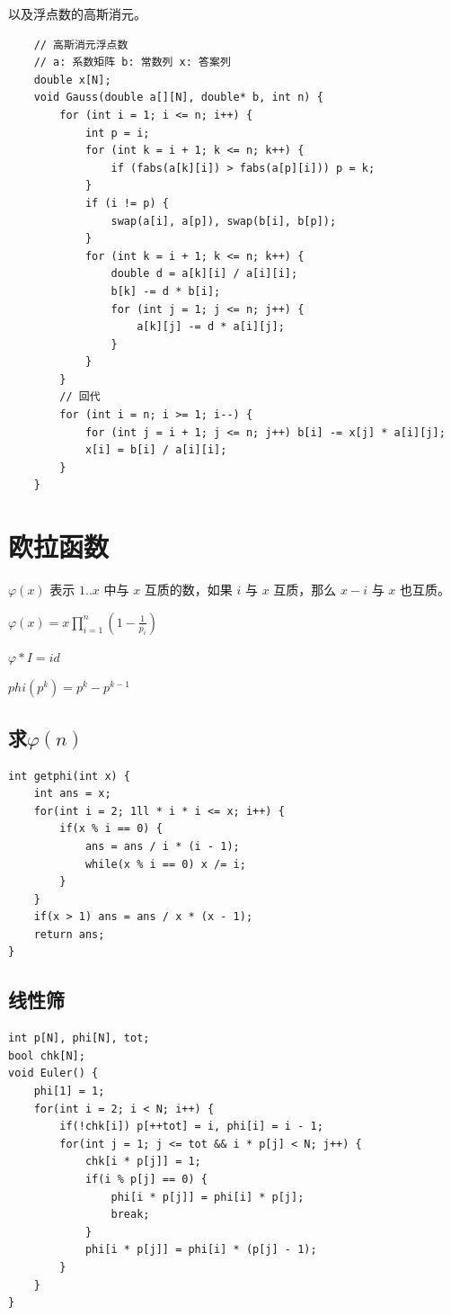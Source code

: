 \documentclass[a4paper,11pt,twoside,fontset = fandol,UTF8]{ctexbook} %
\begin{document}
	以及浮点数的高斯消元。
	
	\begin{lstlisting}
	// 高斯消元浮点数
	// a: 系数矩阵 b: 常数列 x: 答案列
	double x[N];
	void Gauss(double a[][N], double* b, int n) {
	    for (int i = 1; i <= n; i++) {
	        int p = i;
	        for (int k = i + 1; k <= n; k++) {
	            if (fabs(a[k][i]) > fabs(a[p][i])) p = k;
	        }
	        if (i != p) {
	            swap(a[i], a[p]), swap(b[i], b[p]);
	        }
	        for (int k = i + 1; k <= n; k++) {
	            double d = a[k][i] / a[i][i];
	            b[k] -= d * b[i];
	            for (int j = 1; j <= n; j++) {
	                a[k][j] -= d * a[i][j];
	            }
	        }
	    }
	    // 回代 
	    for (int i = n; i >= 1; i--) {
	        for (int j = i + 1; j <= n; j++) b[i] -= x[j] * a[i][j];
	        x[i] = b[i] / a[i][i];
	    }
	}
	\end{lstlisting}
	
	\section{欧拉函数}	
	
	$\varphi(x)$ 表示 $1..x$ 中与 $x$ 互质的数，如果 $i$ 与 $x$ 互质，那么 $x-i$ 与 $x$ 也互质。
	
	$\varphi (x)=x\prod_{i=1}^{n}(1-\frac{1}{p_i})$
	
	$\varphi * I = id$
	
	$phi(p^k)=p^k-p^{k-1}$
	\subsection{求$\varphi (n)$}
	\begin{lstlisting}
int getphi(int x) {
    int ans = x;
    for(int i = 2; 1ll * i * i <= x; i++) {
        if(x % i == 0) {
            ans = ans / i * (i - 1);
            while(x % i == 0) x /= i;
        }
    }
    if(x > 1) ans = ans / x * (x - 1);
    return ans;
}
	\end{lstlisting}
	\subsection{线性筛}
	\begin{lstlisting}
int p[N], phi[N], tot;
bool chk[N];
void Euler() {
    phi[1] = 1;
    for(int i = 2; i < N; i++) {
        if(!chk[i]) p[++tot] = i, phi[i] = i - 1;
        for(int j = 1; j <= tot && i * p[j] < N; j++) {
            chk[i * p[j]] = 1;
            if(i % p[j] == 0) {
                phi[i * p[j]] = phi[i] * p[j];
                break;
            }
            phi[i * p[j]] = phi[i] * (p[j] - 1);
        }
    }
}
	\end{lstlisting}
\end{document}
